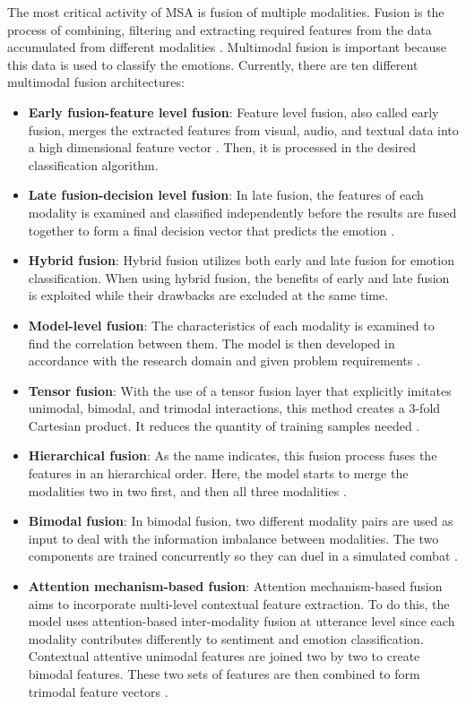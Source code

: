 The most critical activity of MSA is fusion of multiple modalities. Fusion is the process of combining, filtering and extracting required features from the data accumulated from different modalities \cite{MSA-review-3-9686504}. Multimodal fusion is important because this data is used to classify the emotions. Currently, there are ten different multimodal fusion architectures:
%
\begin{itemize}
    \item \textbf{Early fusion-feature level fusion}: Feature level fusion, also called early fusion, merges the extracted features from visual, audio, and textual data into a high dimensional feature vector \cite{MSA_review2_GANDHI2023424}. Then, it is processed in the desired classification algorithm. 
    \item \textbf{Late fusion-decision level fusion}: In late fusion, the features of each modality is examined and classified independently before the results are fused together to form a final decision vector that predicts the emotion \cite{MSA-review-3-9686504}. 
    \item \textbf{Hybrid fusion}: Hybrid fusion utilizes both early and late fusion for emotion classification. When using hybrid fusion, the benefits of early and late fusion is exploited while their drawbacks are excluded at the same time.
    \item \textbf{Model-level fusion}: The characteristics of each modality is examined to find the correlation between them. The model is then developed in accordance with the research domain and given problem requirements \cite{MSA-review-3-9686504}. 
    \item \textbf{Tensor fusion}: With the use of a tensor fusion layer that explicitly imitates unimodal, bimodal, and trimodal interactions, this method creates a 3-fold Cartesian product. It reduces the quantity of training samples needed \cite{MSA_review2_GANDHI2023424}.
    \item \textbf{Hierarchical fusion}: As the name indicates, this fusion process fuses the features in an hierarchical order. Here, the model starts to merge the modalities two in two first, and then all three modalities \cite{MSA_review2_GANDHI2023424}.
    \item \textbf{Bimodal fusion}: In bimodal fusion, two different modality pairs are used as input to deal with the information imbalance between modalities. The two components are trained concurrently so they can duel in a simulated combat \cite{MSA_review2_GANDHI2023424}.
    \item \textbf{Attention mechanism-based fusion}: Attention mechanism-based fusion aims to incorporate multi-level contextual feature extraction. To do this, the model uses attention-based inter-modality fusion at utterance level since each modality contributes differently to sentiment and emotion classification. Contextual attentive unimodal features are joined two by two to create bimodal features. These two sets of features are then combined to form trimodal feature vectors \cite{MSA_review2_GANDHI2023424}.

\end{itemize}
